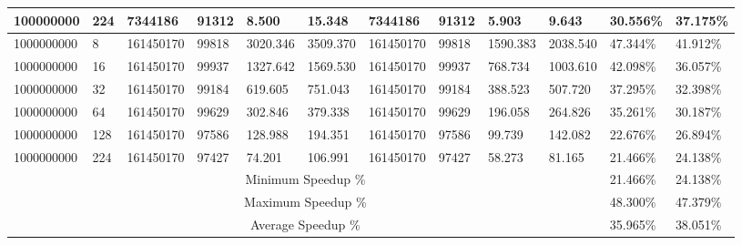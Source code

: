 \begin{tabular}{|l|l|l|l|l|l|l|l|l|l|l|l| }
100000000 &  224 & 7344186 & 91312 & 8.500& 15.348& 7344186 & 91312 & 5.903& 9.643 & 30.556\% & 37.175\% \\ \hline 
1000000000 &  8 & 161450170 & 99818 & 3020.346& 3509.370& 161450170 & 99818 & 1590.383& 2038.540 & 47.344\% & 41.912\% \\ \hline 
1000000000 &  16 & 161450170 & 99937 & 1327.642& 1569.530& 161450170 & 99937 & 768.734& 1003.610 & 42.098\% & 36.057\% \\ \hline 
1000000000 &  32 & 161450170 & 99184 & 619.605& 751.043& 161450170 & 99184 & 388.523& 507.720 & 37.295\% & 32.398\% \\ \hline 
1000000000 &  64 & 161450170 & 99629 & 302.846& 379.338& 161450170 & 99629 & 196.058& 264.826 & 35.261\% & 30.187\% \\ \hline 
1000000000 &  128 & 161450170 & 97586 & 128.988& 194.351& 161450170 & 97586 & 99.739& 142.082 & 22.676\% & 26.894\% \\ \hline 
1000000000 &  224 & 161450170 & 97427 & 74.201& 106.991& 161450170 & 97427 & 58.273& 81.165 & 21.466\% & 24.138\% \\ \hline 
\hline
\multicolumn{10}{|c|}{Minimum Speedup \%} & 21.466\% & 24.138\% \\ 
\hline
\multicolumn{10}{|c|}{Maximum Speedup \%} & 48.300\% & 47.379\% \\ \hline 
\hline
\multicolumn{10}{|c|}{Average Speedup \%} & 35.965\% & 38.051\% \\ \hline 
\end{tabular}
